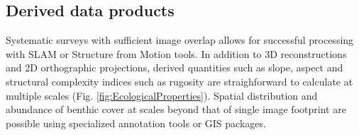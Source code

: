 \subsection{Derived data products}
Systematic surveys with sufficient image overlap allows for successful processing with SLAM or Structure from Motion tools. In addition to 3D reconstructions and 2D orthographic projections, derived quantities such as slope, aspect and structural complexity indices such as rugosity are straighforward to calculate at multiple scales \cite{Friedman_2013} (Fig. \ref{fig:EcologicalProperties}). Spatial distribution and abundance of benthic cover at scales beyond that of single image footprint are possible using specialized annotation tools or GIS packages.
